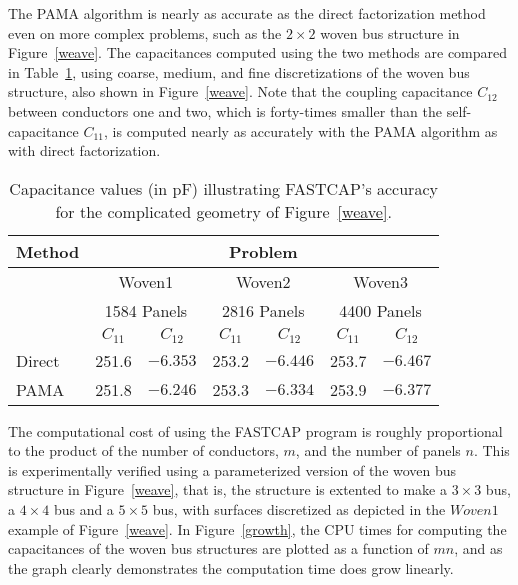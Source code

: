 

The PAMA algorithm is nearly as accurate as the direct factorization
method even on more complex problems, such as the $ 2 \times 2$ woven bus
structure in Figure~\ref{weave}.  The capacitances computed using the
two methods are compared in Table~\ref{weavres}, using coarse, medium,
and fine discretizations of the woven bus structure, also shown in
Figure~\ref{weave}.  Note that the coupling capacitance $C_{12}$
between conductors one and two, which is forty-times smaller than the
self-capacitance $ C_{11} $, is computed nearly as accurately with the PAMA
algorithm as with direct factorization.

\begin{table}
\begin{center}
\begin{tabular}{|l|c|c|c|c|c|c|}
\hline
Method & \multicolumn{6}{c|}{Problem} \\ \hline
 & \multicolumn{2}{c|}{Woven1} 
 & \multicolumn{2}{c|}{Woven2} 
 & \multicolumn{2}{c|}{Woven3} \\ 
 & \multicolumn{2}{c|}{1584 Panels} 
 & \multicolumn{2}{c|}{2816 Panels} 
 & \multicolumn{2}{c|}{4400 Panels} \\ \cline{2-7}
       & $ C_{11} $ & $ C_{12} $ & $ C_{11} $ & $ C_{12} $ 
       & $C_{11} $ & $ C_{12} $ \\ \hline
Direct & 251.6  &  $-6.353$  & 253.2 & $-6.446$ &  253.7 &   $-6.467$  \\\hline
PAMA  & 251.8  &  $-6.246$  & 253.3 & $-6.334$ & 253.9  &  $-6.377$  \\\hline
\end{tabular}
\caption{Capacitance values (in pF) 
illustrating FASTCAP's accuracy for the complicated
geometry of Figure~\protect\ref{weave}.}
\label{weavres}
\end{center}
\end{table}



The computational cost of using the FASTCAP program is roughly
proportional to the product of the number of conductors, $ m $, and
the number of panels $ n $.  This is experimentally verified using a
parameterized version of the woven bus structure in
Figure~\ref{weave}, that is, the structure is extented to make a $ 3
\times 3 $ bus, a $ 4 \times 4 $ bus and a $ 5 \times 5 $ bus, with
surfaces discretized as depicted in the $Woven1 $ example of
Figure~\ref{weave}. In Figure~\ref{growth}, the CPU times for
computing the capacitances of the woven bus structures are plotted as
a function of $ mn $, and as the graph clearly demonstrates the
computation time does grow linearly.

